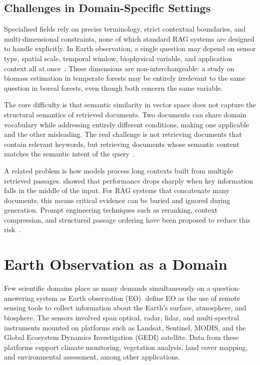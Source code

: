 \subsection{Challenges in Domain-Specific Settings}

Specialised fields rely on precise terminology, strict contextual boundaries, and multi-dimensional constraints, none of which standard RAG systems are designed to handle explicitly. In Earth observation, a single question may depend on sensor type, spatial scale, temporal window, biophysical variable, and application context all at once~\citep{aschbacher2020earth}. These dimensions are non-interchangeable: a study on biomass estimation in temperate forests may be entirely irrelevant to the same question in boreal forests, even though both concern the same variable.

The core difficulty is that semantic similarity in vector space does not capture the structural semantics of retrieved documents. Two documents can share domain vocabulary while addressing entirely different conditions, making one applicable and the other misleading. The real challenge is not retrieving documents that contain relevant keywords, but retrieving documents whose semantic content matches the semantic intent of the query~\citep{lewis2020retrieval}.

A related problem is how models process long contexts built from multiple retrieved passages. \citet{liu2024lost} showed that performance drops sharply when key information falls in the middle of the input. For RAG systems that concatenate many documents, this means critical evidence can be buried and ignored during generation. Prompt engineering techniques such as reranking, context compression, and structured passage ordering have been proposed to reduce this risk~\citep{xu2023recomp}.

\section{Earth Observation as a Domain}
\label{sec:earth-observation-domain}

Few scientific domains place as many demands simultaneously on a question-answering system as Earth observation (EO). \citet{aschbacher2020earth} define EO as the use of remote sensing tools to collect information about the Earth's surface, atmosphere, and biosphere. The sensors involved span optical, radar, lidar, and multi-spectral instruments mounted on platforms such as Landsat, Sentinel, MODIS, and the Global Ecosystem Dynamics Investigation (GEDI) satellite. Data from these platforms support climate monitoring, vegetation analysis, land cover mapping, and environmental assessment, among other applications.

